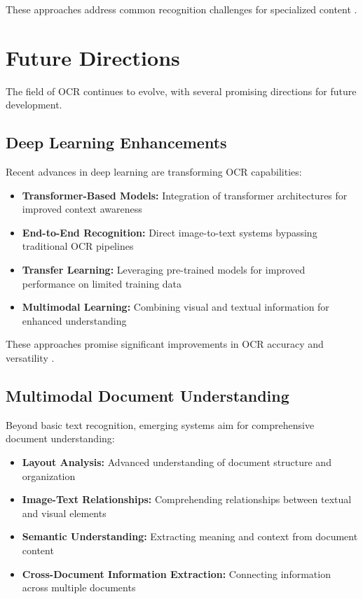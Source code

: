 These approaches address common recognition challenges for specialized content \cite{Anitha:2024}.

\section{Future Directions}
\label{sec:future}

The field of OCR continues to evolve, with several promising directions for future development.

\subsection{Deep Learning Enhancements}
\label{subsec:deep_learning}

Recent advances in deep learning are transforming OCR capabilities:

\begin{itemize}
	\item \textbf{Transformer-Based Models:} Integration of transformer architectures for improved context awareness
	\item \textbf{End-to-End Recognition:} Direct image-to-text systems bypassing traditional OCR pipelines
	\item \textbf{Transfer Learning:} Leveraging pre-trained models for improved performance on limited training data
	\item \textbf{Multimodal Learning:} Combining visual and textual information for enhanced understanding
\end{itemize}

These approaches promise significant improvements in OCR accuracy and versatility \cite{Restack:2025}.

\subsection{Multimodal Document Understanding}
\label{subsec:multimodal}

Beyond basic text recognition, emerging systems aim for comprehensive document understanding:

\begin{itemize}
	\item \textbf{Layout Analysis:} Advanced understanding of document structure and organization
	\item \textbf{Image-Text Relationships:} Comprehending relationships between textual and visual elements
	\item \textbf{Semantic Understanding:} Extracting meaning and context from document content
	\item \textbf{Cross-Document Information Extraction:} Connecting information across multiple documents
\end{itemize}

